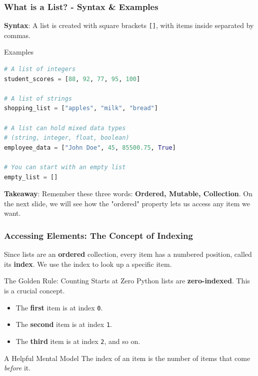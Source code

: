 \documentclass{beamer}
\begin{document}
\begin{frame}[fragile]
    \frametitle{What is a List? - Syntax \& Examples}
    
    \textbf{Syntax}: A list is created with square brackets \texttt{[]}, with items inside separated by commas.
    
    \vspace{1em}
    
    \begin{block}{Examples}
\begin{lstlisting}[language=Python]
# A list of integers
student_scores = [88, 92, 77, 95, 100]

# A list of strings
shopping_list = ["apples", "milk", "bread"]

# A list can hold mixed data types
# (string, integer, float, boolean)
employee_data = ["John Doe", 45, 85500.75, True]

# You can start with an empty list
empty_list = []
\end{lstlisting}
    \end{block}
    
    \vfill
    
    \textbf{Takeaway}: Remember these three words: \textbf{Ordered, Mutable, Collection}. On the next slide, we will see how the "ordered" property lets us access any item we want.
    
\end{frame}

\begin{frame}[fragile]
    \frametitle{Accessing Elements: The Concept of Indexing}
    
    Since lists are an \textbf{ordered} collection, every item has a numbered position, called its \textbf{index}. We use the index to look up a specific item.
    
    \vspace{1em}
    
    \begin{alertblock}{The Golden Rule: Counting Starts at Zero}
        Python lists are \textbf{zero-indexed}. This is a crucial concept.
        \begin{itemize}
            \item The \textbf{first} item is at index \texttt{0}.
            \item The \textbf{second} item is at index \texttt{1}.
            \item The \textbf{third} item is at index \texttt{2}, and so on.
        \end{itemize}
    \end{alertblock}
    
    \vspace{1em}
    
    \begin{block}{A Helpful Mental Model}
        The index of an item is the number of items that come \textit{before} it.
    \end{block}
    
\end{frame}
\end{document}
